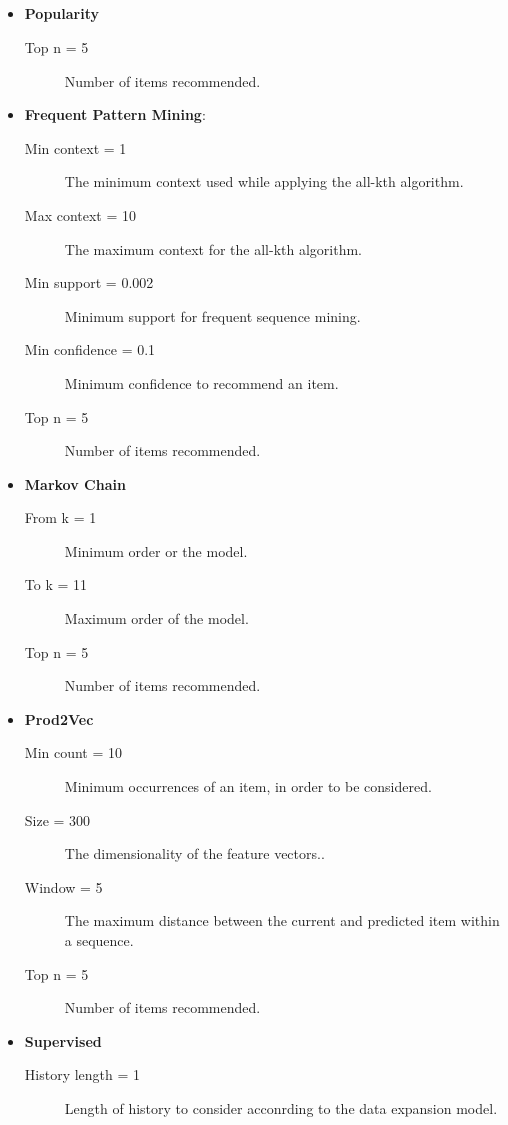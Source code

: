 \documentclass[prodmode,acmtecs]{acmsmall} %
\begin{document}
\subsection{}
\begin{itemize}
	\item \textbf{Popularity}
		\begin{description}
		\item [Top n = 5] Number of items recommended.
	\end{description}
	\item \textbf{Frequent Pattern Mining}: 
		\begin{description}
			\item [Min context = 1] The minimum context used while applying the all-kth algorithm\cite{nakagawa03impact}.
			\item [Max context = 10] The maximum context for the all-kth algorithm.
			\item [Min support = 0.002] Minimum support for frequent sequence mining.
			\item [Min confidence = 0.1] Minimum confidence to recommend an item.
						\item [Top n = 5] Number of items recommended.
		\end{description}
	\item \textbf{Markov Chain}
		\begin{description}
				\item [From k = 1] Minimum order or the model.
				\item [To k = 11] Maximum order of the model.
							\item [Top n = 5] Number of items recommended.
		\end{description}
	\item \textbf{Prod2Vec} 
	\begin{description}
		\item [Min count = 10] Minimum occurrences of an item, in order to be considered.
		\item [Size = 300]  The dimensionality of the feature vectors..
		\item [Window = 5]  The maximum distance between the current and predicted item within a sequence.
		\item [Top n = 5] Number of items recommended.
	\end{description}
	\item \textbf{Supervised} 
	\begin{description}
		\item [History length = 1] Length of history to consider acconrding to the data expansion model.\cite{zidmars01temporal}

\end{description}
\end{itemize}
\end{document}
